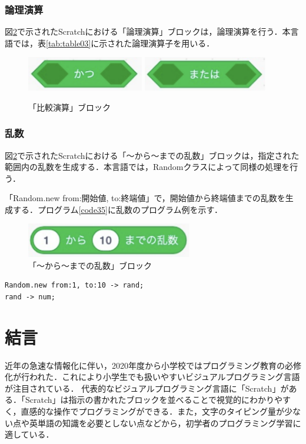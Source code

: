 \documentclass[10pt,a4j]{ltjsarticle}
\begin{document}
\subsubsection{論理演算}
図\ref{fig:log}で示されたScratchにおける「論理演算」ブロックは，論理演算を行う．本言語では，表\ref{tab:table03}に示された論理演算子を用いる．

\begin{figure}[H]
  \centering
  \includegraphics[height=15mm]{images/and.pdf}
  \includegraphics[height=15mm]{images/or.pdf}
  \caption{「比較演算」ブロック}
  \label{fig:log}
\end{figure}

\subsubsection{乱数}
図\ref{fig:log}で示されたScratchにおける「〜から〜までの乱数」ブロックは，指定された範囲内の乱数を生成する．本言語では，Randomクラスによって同様の処理を行う．

「Random.new from:開始値, to:終端値」で，開始値から終端値までの乱数を生成する．プログラム\ref{code35}に乱数のプログラム例を示す．

\begin{figure}[H]
  \centering
  \includegraphics[height=15mm]{images/random.pdf}
  \caption{「〜から〜までの乱数」ブロック}
  \label{fig:log}
\end{figure}

\begin{lstlisting}[caption=乱数のプログラム例, label=code35]
Random.new from:1, to:10 -> rand;
rand -> num;
\end{lstlisting}
\clearpage

\section{結言}
近年の急速な情報化に伴い，2020年度から小学校ではプログラミング教育の必修化が行われた．これにより小学生でも扱いやすいビジュアルプログラミング言語が注目されている．
代表的なビジュアルプログラミング言語に「Scratch」がある．「Scratch」は指示の書かれたブロックを並べることで視覚的にわかりやすく，直感的な操作でプログラミングができる．また，文字のタイピング量が少ない点や英単語の知識を必要としない点などから，初学者のプログラミング学習に適している．
\end{document}
